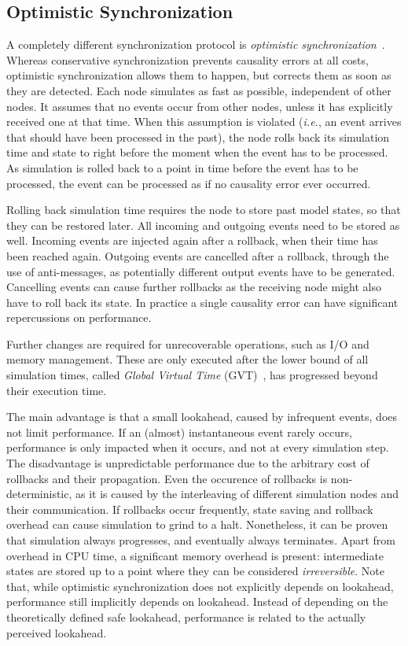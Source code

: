 \subsection{Optimistic Synchronization}
A completely different synchronization protocol is \textit{optimistic synchronization}~\cite{TimeWarp}.
Whereas conservative synchronization prevents causality errors at all costs, optimistic synchronization allows them to happen, but corrects them as soon as they are detected.
Each node simulates as fast as possible, independent of other nodes.
It assumes that no events occur from other nodes, unless it has explicitly received one at that time.
When this assumption is violated (\textit{i.e.}, an event arrives that should have been processed in the past), the node rolls back its simulation time and state to right before the moment when the event has to be processed.
As simulation is rolled back to a point in time before the event has to be processed, the event can be processed as if no causality error ever occurred.

Rolling back simulation time requires the node to store past model states, so that they can be restored later.
All incoming and outgoing events need to be stored as well.
Incoming events are injected again after a rollback, when their time has been reached again.
Outgoing events are cancelled after a rollback, through the use of anti-messages, as potentially different output events have to be generated.
Cancelling events can cause further rollbacks as the receiving node might also have to roll back its state.
In practice a single causality error can have significant repercussions on performance.

Further changes are required for unrecoverable operations, such as I/O and memory management.
These are only executed after the lower bound of all simulation times, called \textit{Global Virtual Time} (GVT)~\cite{FujimotoBook}, has progressed beyond their execution time.

The main advantage is that a small lookahead, caused by infrequent events, does not limit performance.
If an (almost) instantaneous event rarely occurs, performance is only impacted when it occurs, and not at every simulation step.
The disadvantage is unpredictable performance due to the arbitrary cost of rollbacks and their propagation.
Even the occurence of rollbacks is non-deterministic, as it is caused by the interleaving of different simulation nodes and their communication.
If rollbacks occur frequently, state saving and rollback overhead can cause simulation to grind to a halt.
Nonetheless, it can be proven that simulation always progresses, and eventually always terminates.
Apart from overhead in CPU time, a significant memory overhead is present: intermediate states are stored up to a point where they can be considered \textit{irreversible}.
Note that, while optimistic synchronization does not explicitly depends on lookahead, performance still implicitly depends on lookahead.
Instead of depending on the theoretically defined safe lookahead, performance is related to the actually perceived lookahead.

